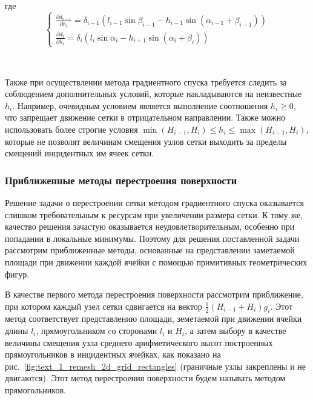 где
\begin{equation}
\begin{cases}
\frac{\partial d_{i - 1}}{\partial h_i} = \delta_{i - 1}(l_{i - 1} \sin \beta_{i - 1} - h_{i - 1} \sin(\alpha_{i - 1} + \beta_{i - 1})) \\
\frac{\partial d_i}{\partial h_i} = \delta_i(l_i \sin \alpha_i - h_{i + 1} \sin(\alpha_i + \beta_i))
\end{cases}
\end{equation}

\

Также при осуществлении метода градиентного спуска требуется следить за соблюдением дополнительных условий, которые накладываются на неизвестные $h_i$.
Например, очевидным условием является выполнение соотношения $h_i \ge 0$, что запрещает движение сетки в отрицательном направлении.
Также можно использовать более строгие условия $\min(H_{i - 1}, H_i) \le h_i \le \max(H_{i - 1}, H_i)$, которые не позволят величинам смещения узлов сетки выходить за пределы смещений инцидентных им ячеек сетки.

\subsubsection{Приближенные методы перестроения поверхности}

Решение задачи о перестроении сетки методом градиентного спуска оказывается слишком требовательным к ресурсам при увеличении размера сетки.
К тому же, качество решения зачастую оказывается неудовлетворительным, особенно при попадании в локальные минимумы.
Поэтому для решения поставленной задачи рассмотрим приближенные методы, основанные на представлении заметаемой площади при движении каждой ячейки с помощью примитивных геометрических фигур.

В качестве первого метода перестроения поверхности рассмотрим приближение, при котором каждый узел сетки сдвигается на вектор $\frac{1}{2}(H_{i - 1} + H_i)\overline{g}_i$.
Этот метод соответствует представлению площади, земетаемой при движении ячейки длины $l_i$, прямоугольником cо сторонами $l_i$ и $H_i$, а затем выбору в качестве величины смещения узла среднего арифметического высот построенных прямоугольников в инцидентных ячейках, как показано на рис.~\ref{fig:text_1_remesh_2d_grid_rectangles} (граничные узлы закреплены и не двигаются).
Этот метод перестроения поверхности будем называть методом прямогольников\label{term:method_remesh_rect}.

